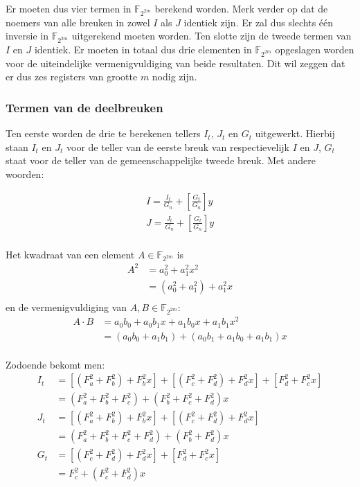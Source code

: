 Er moeten dus vier termen in $\mathbb{F}_{2^{2m}}$ berekend worden. Merk verder op dat de noemers van alle breuken in zowel $I$ als $J$ identiek zijn. Er zal dus slechts \'e\'en inversie in $\mathbb{F}_{2^{2m}}$ uitgerekend moeten worden. Ten slotte zijn de tweede termen van $I$ en $J$ identiek. Er moeten in totaal dus drie elementen in $\mathbb{F}_{2^{2m}}$ opgeslagen worden voor de uiteindelijke vermenigvuldiging van beide resultaten. Dit wil zeggen dat er dus zes registers van grootte $m$ nodig zijn.

\subsubsection{Termen van de deelbreuken}

Ten eerste worden de drie te berekenen tellers $I_t$, $J_t$ en $G_t$ uitgewerkt. Hierbij staan $I_t$ en $J_t$ voor de teller van de eerste breuk van respectievelijk $I$ en $J$, $G_t$ staat voor de teller van de gemeenschappelijke tweede breuk. Met andere woorden:

\[\begin{aligned}
I = \frac{I_t}{G_n} + \left[ \frac{G_t}{G_n} \right] y\\
J = \frac{J_t}{G_n} + \left[ \frac{G_t}{G_n} \right] y\\
\end{aligned}\]

Het kwadraat van een element $A \in \mathbb{F}_{2^{2m}}$ is
\[\begin{aligned}
A^2	&= a_0^2 + a_1^2 x^2\\
		&= (a_0^2 + a_1^2) + a_1^2 x\\
\end{aligned}\]
en de vermenigvuldiging van $A, B \in \mathbb{F}_{2^{2m}}$:
\[\begin{aligned}
A \cdot B	&= a_0 b_0 + a_0 b_1 x + a_1 b_0 x + a_1 b_1 x^2\\
				&= (a_0 b_0 + a_1 b_1) + (a_0 b_1 + a_1 b_0 + a_1 b_1)x\\
\end{aligned}\]

Zodoende bekomt men:
\[\begin{aligned}
I_t	&= [(F_a^2 + F_b^2) + F_b^2 x] + [(F_c^2 + F_d^2) + F_d^2x] + [F_d^2 + F_c^2x]\\
		&= (F_a^2 + F_b^2 + F_c^2) + (F_b^2 + F_c^2 + F_d^2)x\\
J_t	&= [(F_a^2 + F_b^2) + F_b^2 x] + [(F_c^2 + F_d^2) + F_d^2x]\\
		&= (F_a^2 + F_b^2 + F_c^2 + F_d^2) + (F_b^2 + F_d^2)x\\
G_t	&= [(F_c^2 + F_d^2) + F_d^2x] + [F_d^2 + F_c^2x]\\
		&= F_c^2 + (F_c^2 + F_d^2)x\\
\end{aligned}\]

